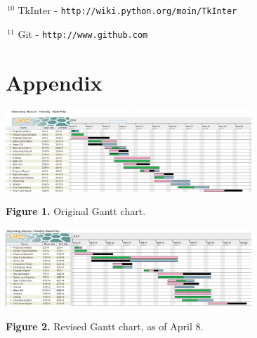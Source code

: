 \documentclass{article}
\begin{document}
\noindent
$\,^{10}$
TkInter - {\tt http://wiki.python.org/moin/TkInter}

\vspace{.3em}

\noindent
$\,^{11}$
Git - {\tt http://www.github.com}

\vspace{.3em}

\clearpage

\section*{Appendix}

\begin{center}

\includegraphics[width=350px]{Gantt.png}

{\bf Figure 1.} Original Gantt chart.
\end{center}


\begin{center}

\includegraphics[width=350px]{Gantt2.png}

{\bf Figure 2.} Revised Gantt chart, as of April 8.
\end{center}
\end{document}

